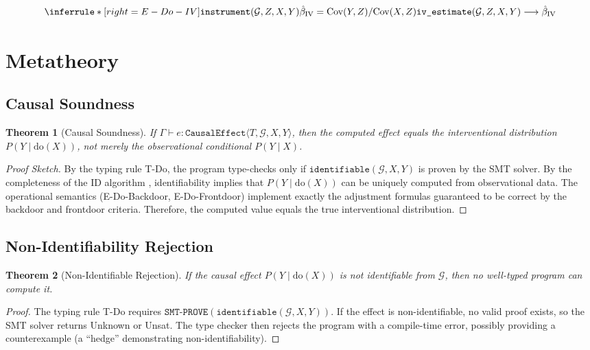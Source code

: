 \documentclass[11pt]{article}
\newtheorem{theorem}{Theorem}
\begin{document}
\[
\inferrule*[right=E-Do-IV]
  {\texttt{instrument}(\mathcal{G}, Z, X, Y) \\
   \hat{\beta}_{\text{IV}} = \text{Cov}(Y, Z) / \text{Cov}(X, Z)}
  {\texttt{iv\_estimate}(\mathcal{G}, Z, X, Y) \longrightarrow
   \hat{\beta}_{\text{IV}}}
\]

\section{Metatheory}

\subsection{Causal Soundness}
\begin{theorem}[Causal Soundness]
If $\Gamma \vdash e : \texttt{CausalEffect}\langle T, \mathcal{G}, X, Y \rangle$, then the computed effect equals the interventional distribution $P(Y \mid \text{do}(X))$, not merely the observational conditional $P(Y \mid X)$.
\end{theorem}

\begin{proof}[Proof Sketch]
By the typing rule T-Do, the program type-checks only if $\texttt{identifiable}(\mathcal{G}, X, Y)$ is proven by the SMT solver. By the completeness of the ID algorithm \cite{tian2002general}, identifiability implies that $P(Y \mid \text{do}(X))$ can be uniquely computed from observational data. The operational semantics (E-Do-Backdoor, E-Do-Frontdoor) implement exactly the adjustment formulas guaranteed to be correct by the backdoor and frontdoor criteria. Therefore, the computed value equals the true interventional distribution.
\end{proof}

\subsection{Non-Identifiability Rejection}
\begin{theorem}[Non-Identifiable Rejection]
If the causal effect $P(Y \mid \text{do}(X))$ is not identifiable from $\mathcal{G}$, then no well-typed program can compute it.
\end{theorem}

\begin{proof}
The typing rule T-Do requires $\texttt{SMT-PROVE}(\texttt{identifiable}(\mathcal{G}, X, Y))$. If the effect is non-identifiable, no valid proof exists, so the SMT solver returns Unknown or Unsat. The type checker then rejects the program with a compile-time error, possibly providing a counterexample (a ``hedge'' demonstrating non-identifiability).
\end{proof}
\end{document}
